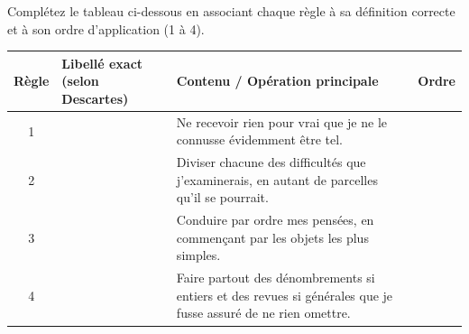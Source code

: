 \documentclass[11pt]{article}
\begin{document}
\begin{exercice}
Complétez le tableau ci-dessous en associant chaque règle à sa définition correcte et à son ordre d'application (1 à 4).
\begin{center}
\begin{tabular}{|c|p{5cm}|p{5cm}|c|}
\hline
\textbf{Règle} & \textbf{Libellé exact (selon Descartes)} & \textbf{Contenu / Opération principale} & \textbf{Ordre} \\
\hline
1 & & Ne recevoir rien pour vrai que je ne le connusse évidemment être tel. & \\
\hline
2 & & Diviser chacune des difficultés que j'examinerais, en autant de parcelles qu'il se pourrait. & \\
\hline
3 & & Conduire par ordre mes pensées, en commençant par les objets les plus simples. & \\
\hline
4 & & Faire partout des dénombrements si entiers et des revues si générales que je fusse assuré de ne rien omettre. & \\
\hline
\end{tabular}
\end{center}
\end{exercice}
\end{document}
